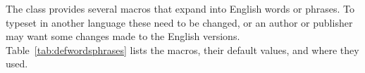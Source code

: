     The class provides several macros that expand into English words or 
phrases. To typeset in another language these need to be changed, or an
author or publisher may want some changes made to the English versions. 
Table~\ref{tab:defwordsphrases} lists the macros, their default values, 
and where they used.

